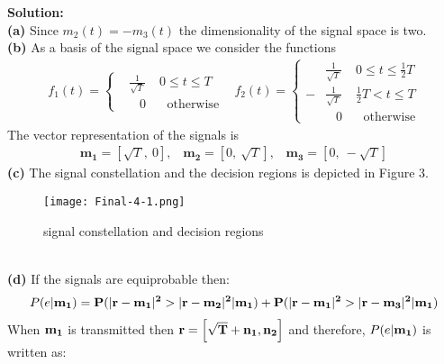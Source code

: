 \documentclass[a4paper,12pt]{article}
\begin{document}
\begin{enumerate}
            \textbf{Solution:} \\
            \textbf{(a)} Since $m_2(t) = -m_3(t)$ the dimensionality of the signal space is two. \\
            \textbf{(b)} As a basis of the signal space we consider the functions 
            \begin{align*}
                f_1(t) = \left\{
                \begin{aligned}
                    & \frac{1}{\sqrt{T}} \;\;\;\;  0 \leq t \leq T \\ 
                    & \;\;\; 0 \;\;\;\;\;\; \text{otherwise}
                \end{aligned}
                \right.
                \;\;\;
                f_2(t) = \left\{
                \begin{aligned}
                    &\frac{1}{\sqrt{T}}  \;\;\;\; 0 \leq t \leq \frac{1}{2}T \\ 
                    -&\frac{1}{\sqrt{T}} \;\;\;\; \frac{1}{2}T < t \leq T \\
                     & \;\;\; 0 \;\;\;\;\;\; \text{otherwise}
                \end{aligned}
                \right.
            \end{align*}
            The vector representation of the signals is 
            \begin{align*}
                \mathbf{m_1} = [\sqrt{T}, \ 0], \;\;\; \mathbf{m_2} = [0, \ \sqrt{T}], \;\;\; \mathbf{m_3} = [0, \ -\sqrt{T}]
            \end{align*}
            \newpage
            \textbf{(c)} The signal constellation and the decision regions is depicted in Figure 3.
            \begin{figure}[h]
                \centering
                \texttt{[image: Final-4-1.png]}
                \caption{signal constellation and decision regions}
            \end{figure} \\ 
            \textbf{(d)} If the signals are equiprobable then:
            \begin{align*}
                P(e | \bf{m_1}) = P(|r - m_1|^2 > |r - m_2|^2 | m_1) + P(|r - m_1|^2 > |r - m_3|^2 | m_1)
            \end{align*}
            When $\bf{m_1}$ is transmitted then $\bf{r} = \left[ \sqrt{T} + n_1, n_2 \right]$ and therefore, $P(e | \bf{m_1})$ is written as:
            \begin{align*}

\end{align*}
\end{enumerate}
\end{document}
